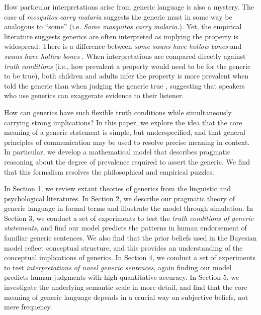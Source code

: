 \documentclass[12pt,letterpaper]{article}
\newcommand{\ndg}[1]{\textcolor{Green}{[ndg: #1]}}
\begin{document}

How particular interpretations arise from generic language is also a mystery.
The case of \emph{mosquitos carry malaria} suggests the generic must in some way be analogous to ``some'' (i.e. \emph{Some mosquitos carry malaria.}). 
Yet, the empirical literature suggests generics are often interpreted as implying the property is widespread:
There is a difference between \emph{some swans have hollow bones} and \emph{swans have hollow bones} \cite{Gelman2002}.
When interpretations are compared directly against \emph{truth conditions} (i.e., how prevalent a property would need to be for the generic to be true), both children and adults infer the property is more prevalent when told the generic than when judging the generic true \cite{Cimpian2010,Brandone2014}, suggesting that speakers who use generics can exaggerate evidence to their listener.

How can generics have such flexible truth conditions while simultaneously carrying strong implications?
In this paper, we explore the idea that the core meaning of a generic statement is simple, but underspecified, and that general principles of communication may be used to resolve precise meaning in context. 
In particular, we develop a mathematical model that describes pragmatic reasoning about the degree of prevalence required to assert the generic.  
We find that this formalism resolves the philosophical and empirical puzzles.

In Section 1, we review extant theories of generics from the linguistic and psychological literatures.
In Section 2, we describe our pragmatic theory of generic language in formal terms and illustrate the model through simulation. 
In Section 3, we conduct a set of experiments to test the \emph{truth conditions of generic statements}, and find our model predicts the patterns in human endorsement of familiar generic sentences.
We also find that the prior beliefs used in the Bayesian model reflect conceptual structure, and this provides an understanding of the conceptual implications of generics.
In Section 4, we conduct a set of experiments to test \emph{interpretations of novel generic sentences}, again finding our model predicts human judgments with high quantitative accuracy.
In Section 5, we investigate the underlying semantic scale in more detail, and find that the core meaning of generic language depends in a crucial way on subjective beliefs, not mere frequency.
\end{document}
